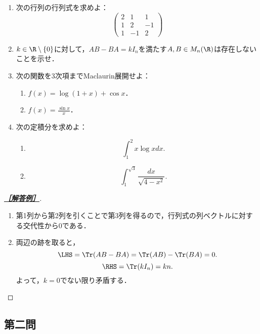 \documentclass[uplatex,dvipdfmx]{jsarticle}
\begin{document}
\begin{tcolorbox}[colframe=ForestGreen, colback=ForestGreen!10!white,breakable,colbacktitle=ForestGreen!40!white,coltitle=black,fonttitle=\bfseries\sffamily,
    title=第１問]
    \begin{problem}\mbox{}
        \begin{enumerate}[{問}1]
            \item 次の行列の行列式を求めよ：
            \[\begin{pmatrix}
                2&1&1\\1&2&-1\\1&-1&2
            \end{pmatrix}\]
            \item $k\in\R\setminus\{0\}$に対して，$AB-BA=kI_n$を満たす$A,B\in M_n(\R)$は存在しないことを示せ．
            \item 次の関数を3次項までMaclaurin展開せよ：
            \begin{enumerate}[(1)]
                \item $f(x)=\log(1+x)+\cos x$．
                \item $f(x)=\frac{\sin x}{x}$．
            \end{enumerate}
            \item 次の定積分を求めよ：
            \begin{enumerate}[(1)]
                \item \[\int^2_1x\log xdx.\]
                \item \[\int^{\sqrt{3}}_1\frac{dx}{\sqrt{4-x^2}}.\]
            \end{enumerate}
        \end{enumerate}
    \end{problem}
\end{tcolorbox}
\begin{proof}[\textbf{\underline{［解答例］}}]\mbox{}
    \begin{enumerate}
        \item 第1列から第2列を引くことで第3列を得るので，行列式の列ベクトルに対する交代性から$0$である．
        \item 両辺の跡を取ると，
        \[\LHS=\Tr(AB-BA)=\Tr(AB)-\Tr(BA)=0.\]
        \[\RHS=\Tr(kI_n)=kn.\]
        よって，$k=0$でない限り矛盾する．
    \end{enumerate}
\end{proof}

\subsection{第二問}
\end{document}
